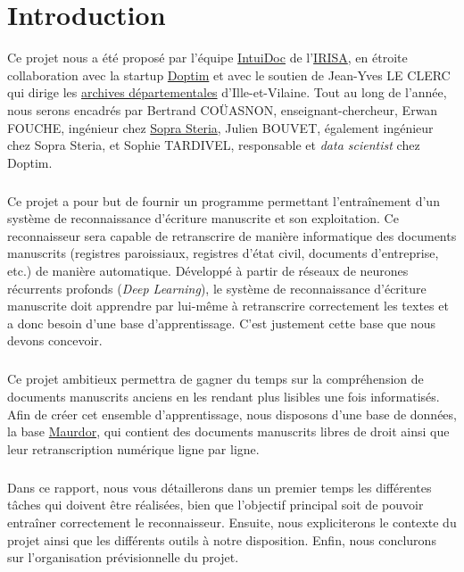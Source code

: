 \chapter{Introduction}
\setcounter{page}{1}

Ce projet nous a été proposé par l’équipe \href{https://www-intuidoc.irisa.fr/}{IntuiDoc}
de l’\href{https://www.irisa.fr/}{IRISA}, en étroite collaboration avec la startup
\href{http://www.doptim.eu}{Doptim} et avec le soutien de Jean-Yves LE CLERC qui dirige
les \href{http://archives.ille-et-vilaine.fr/fr}{archives départementales} d'Ille-et-Vilaine.
Tout au long de l’année, nous serons encadrés par Bertrand COÜASNON, enseignant-chercheur,
Erwan FOUCHE, ingénieur chez \href{https://www.soprasteria.com/fr}{Sopra Steria}, Julien BOUVET,
également ingénieur chez Sopra Steria, et Sophie TARDIVEL, responsable et \textit{data scientist}
chez Doptim.

\paragraph{}
Ce projet a pour but de fournir un programme permettant l’entraînement d’un système
de reconnaissance d’écriture manuscrite et son exploitation. Ce reconnaisseur sera
capable de retranscrire de manière informatique des documents manuscrits
(registres paroissiaux, registres d’état civil, documents d’entreprise, etc.)
de manière automatique. Développé à partir de réseaux de neurones récurrents profonds
(\textit{Deep Learning}), le système de reconnaissance d'écriture manuscrite doit apprendre
par lui-même à retranscrire correctement les textes et a donc besoin d’une base
d’apprentissage. C’est justement cette base que nous devons concevoir.

\paragraph{}
Ce projet ambitieux permettra de gagner du temps sur la compréhension de documents
manuscrits anciens en les rendant plus lisibles une fois informatisés.
Afin de créer cet ensemble d’apprentissage, nous disposons d’une base de données,
la base \href{http://www.maurdor-campaign.org/}{Maurdor}, qui contient des documents
manuscrits libres de droit ainsi que leur retranscription numérique ligne par ligne.

\paragraph{}
Dans ce rapport, nous vous détaillerons dans un premier temps les différentes
tâches qui doivent être réalisées, bien que l’objectif principal soit de pouvoir
entraîner correctement le reconnaisseur. Ensuite, nous expliciterons le contexte
du projet ainsi que les différents outils à notre disposition. Enfin, nous conclurons
sur l’organisation prévisionnelle du projet.